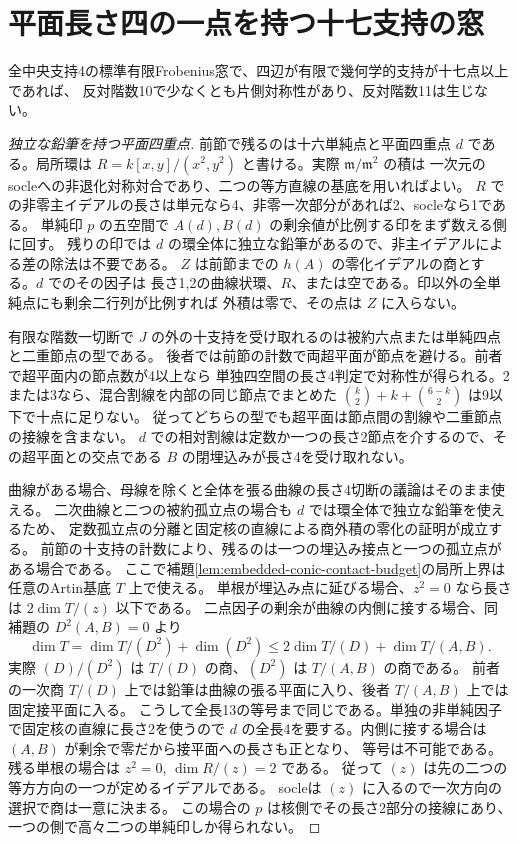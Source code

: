 \section{平面長さ四の一点を持つ十七支持の窓}
\label{sec:finite-planar-four-seventeen}
\begin{theorem}\label{thm:finite-seventeen-all}
全中央支持4の標準有限Frobenius窓で、四辺が有限で幾何学的支持が十七点以上であれば、
反対階数10で少なくとも片側対称性があり、反対階数11は生じない。
\end{theorem}
\begin{proof}[独立な鉛筆を持つ平面四重点]
前節で残るのは十六単純点と平面四重点 $d$ である。局所環は
$R=k[x,y]/(x^2,y^2)$ と書ける。実際 $\mathfrak m/\mathfrak m^2$ の積は
一次元のsocleへの非退化対称対合であり、二つの等方直線の基底を用いればよい。
$R$ での非零主イデアルの長さは単元なら4、非零一次部分があれば2、socleなら1である。
単純印 $p$ の五空間で $A(d),B(d)$ の剰余値が比例する印をまず数える側に回す。
残りの印では $d$ の環全体に独立な鉛筆があるので、非主イデアルによる差の除法は不要である。
$Z$ は前節までの $h(A)$ の零化イデアルの商とする。$d$ でのその因子は
長さ1,2の曲線状環、$R$、または空である。印以外の全単純点にも剰余二行列が比例すれば
外積は零で、その点は $Z$ に入らない。

有限な階数一切断で $J$ の外の十支持を受け取れるのは被約六点または単純四点と二重節点の型である。
後者では前節の計数で両超平面が節点を避ける。前者で超平面内の節点数が4以上なら
単独四空間の長さ4判定で対称性が得られる。2または3なら、混合割線を内部の同じ節点でまとめた
$\binom{k}{2}+k+\binom{6-k}{2}$ は9以下で十点に足りない。
従ってどちらの型でも超平面は節点間の割線や二重節点の接線を含まない。
$d$ での相対割線は定数か一つの長さ2節点を介するので、その超平面との交点である
$B$ の閉埋込みが長さ4を受け取れない。

曲線がある場合、母線を除くと全体を張る曲線の長さ4切断の議論はそのまま使える。
二次曲線と二つの被約孤立点の場合も $d$ では環全体で独立な鉛筆を使えるため、
定数孤立点の分離と固定核の直線による商外積の零化の証明が成立する。
前節の十支持の計数により、残るのは一つの埋込み接点と一つの孤立点がある場合である。
ここで補題\ref{lem:embedded-conic-contact-budget}の局所上界は任意のArtin基底 $T$ 上で使える。
単根が埋込み点に延びる場合、$z^2=0$ なら長さは $2\dim T/(z)$ 以下である。
二点因子の剰余が曲線の内側に接する場合、同補題の $D^2(A,B)=0$ より
\[
 \dim T=\dim T/(D^2)+\dim (D^2)
          \le 2\dim T/(D)+\dim T/(A,B).
\]
実際 $(D)/(D^2)$ は $T/(D)$ の商、$(D^2)$ は $T/(A,B)$ の商である。
前者の一次商 $T/(D)$ 上では鉛筆は曲線の張る平面に入り、後者 $T/(A,B)$ 上では固定接平面に入る。
こうして全長13の等号まで同じである。単独の非単純因子で固定核の直線に長さ2を使うので
$d$ の全長4を要する。内側に接する場合は $(A,B)$ が剰余で零だから接平面への長さも正となり、
等号は不可能である。残る単根の場合は $z^2=0$, $\dim R/(z)=2$ である。
従って $(z)$ は先の二つの等方方向の一つが定めるイデアルである。
socleは $(z)$ に入るので一次方向の選択で商は一意に決まる。
この場合の $p$ は核側でその長さ2部分の接線にあり、一つの側で高々二つの単純印しか得られない。
\end{proof}

